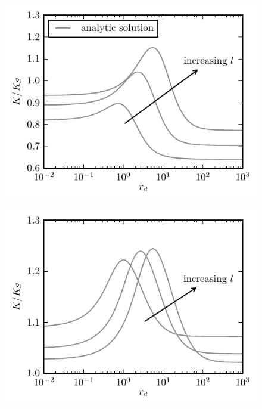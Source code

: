 \vspace{-0.5 cm}
\begin{minipage}[t]{.5 \textwidth}
    \begin{figure}[H]
        \includegraphics[width = 1 \textwidth]{plots/l2_rb_rates.pdf}
    \end{figure}
\end{minipage}\begin{minipage}[t]{.5 \textwidth}
    \begin{figure}[H]
        \includegraphics[width = 1 \textwidth]{plots/l2_ab_rates.pdf}
    \end{figure}
\end{minipage}\\
